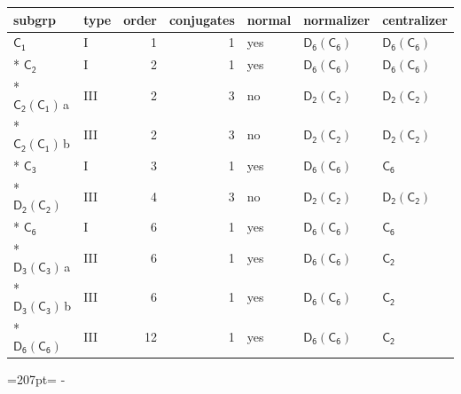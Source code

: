 \documentclass[10pt,a4paper]{article}
\newcommand{\needspace}[1]{\par\penalty-100\begingroup\dimen0=#1\relax\dimen2=\pagegoal
  \advance\dimen2-\pagetotal\ifdim\dimen0>\dimen2\relax\ifdim\dimen2>0pt\vfil\break\fi\fi
  \endgroup}
\numberwithin{equation}{section}
\newcommand{\grp}[1]{\mathsf{#1}}
\newcommand{\clsletter}[1]{\,{\scriptsize\color{black!55}#1}}
\begin{document}
{\small\begin{longtable}{@{}llrrlll@{}}\toprule
subgrp & type & order & conjugates & normal & normalizer & centralizer\\\midrule\endhead
\bottomrule\endfoot\endlastfoot
\href{../../../rotation/data/pdf/C1.pdf}{$\grp{C_{1}}$} & I & 1 & 1 & yes & \href{D6-C6.pdf}{$\grp{D_{6}}(\grp{C_{6}})$} & \href{D6-C6.pdf}{$\grp{D_{6}}(\grp{C_{6}})$}\\*
\href{../../../rotation/data/pdf/C2.pdf}{$\grp{C_{2}}$} & I & 2 & 1 & yes & \href{D6-C6.pdf}{$\grp{D_{6}}(\grp{C_{6}})$} & \href{D6-C6.pdf}{$\grp{D_{6}}(\grp{C_{6}})$}\\*
\href{C2-C1.pdf}{$\grp{C_{2}}(\grp{C_{1}})$}\clsletter{a} & III & 2 & 3 & no & \href{D2-C2.pdf}{$\grp{D_{2}}(\grp{C_{2}})$} & \href{D2-C2.pdf}{$\grp{D_{2}}(\grp{C_{2}})$}\\*
\href{C2-C1.pdf}{$\grp{C_{2}}(\grp{C_{1}})$}\clsletter{b} & III & 2 & 3 & no & \href{D2-C2.pdf}{$\grp{D_{2}}(\grp{C_{2}})$} & \href{D2-C2.pdf}{$\grp{D_{2}}(\grp{C_{2}})$}\\*
\href{../../../rotation/data/pdf/C3.pdf}{$\grp{C_{3}}$} & I & 3 & 1 & yes & \href{D6-C6.pdf}{$\grp{D_{6}}(\grp{C_{6}})$} & \href{../../../rotation/data/pdf/C6.pdf}{$\grp{C_{6}}$}\\*
\href{D2-C2.pdf}{$\grp{D_{2}}(\grp{C_{2}})$} & III & 4 & 3 & no & \href{D2-C2.pdf}{$\grp{D_{2}}(\grp{C_{2}})$} & \href{D2-C2.pdf}{$\grp{D_{2}}(\grp{C_{2}})$}\\*
\href{../../../rotation/data/pdf/C6.pdf}{$\grp{C_{6}}$} & I & 6 & 1 & yes & \href{D6-C6.pdf}{$\grp{D_{6}}(\grp{C_{6}})$} & \href{../../../rotation/data/pdf/C6.pdf}{$\grp{C_{6}}$}\\*
\href{D3-C3.pdf}{$\grp{D_{3}}(\grp{C_{3}})$}\clsletter{a} & III & 6 & 1 & yes & \href{D6-C6.pdf}{$\grp{D_{6}}(\grp{C_{6}})$} & \href{../../../rotation/data/pdf/C2.pdf}{$\grp{C_{2}}$}\\*
\href{D3-C3.pdf}{$\grp{D_{3}}(\grp{C_{3}})$}\clsletter{b} & III & 6 & 1 & yes & \href{D6-C6.pdf}{$\grp{D_{6}}(\grp{C_{6}})$} & \href{../../../rotation/data/pdf/C2.pdf}{$\grp{C_{2}}$}\\*
\href{D6-C6.pdf}{$\grp{D_{6}}(\grp{C_{6}})$} & III & 12 & 1 & yes & \href{D6-C6.pdf}{$\grp{D_{6}}(\grp{C_{6}})$} & \href{../../../rotation/data/pdf/C2.pdf}{$\grp{C_{2}}$}\\
\bottomrule\end{longtable}}
\needspace{207pt}
\end{document}
